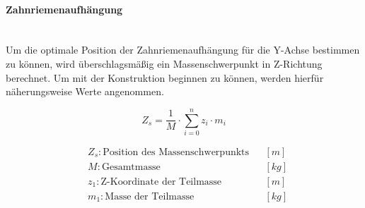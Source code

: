 \paragraph{Zahnriemenaufhängung}\mbox{}\\
Um die optimale Position der Zahnriemenaufhängung für die Y-Achse bestimmen zu können, wird überschlagsmäßig ein Massenschwerpunkt in Z-Richtung berechnet. Um mit der Konstruktion beginnen zu können, werden hierfür näherungsweise Werte angenommen.

\noindent\begin{minipage}{\textwidth}
\begin{minipage}[t]{0.5\textwidth}
    \vspace{7mm}
    \begin{equation*}
        Z_s = \frac{1}{M} \cdot \displaystyle\sum_{i = 0}^{n} z_i \cdot m_i
    \end{equation*}
\end{minipage}%
\begin{minipage}[t]{0.5\textwidth}
    \begin{align*}
        &Z_s: \text{Position des Massenschwerpunkts} & &\left[m\right]\\
        &M: \text{Gesamtmasse} & &\left[kg\right]\\
        &z_1: \text{Z-Koordinate der Teilmasse} & &\left[m\right] \\
        &m_1: \text{Masse der Teilmasse} & &\left[kg\right]
    \end{align*}
\end{minipage}
\end{minipage}

